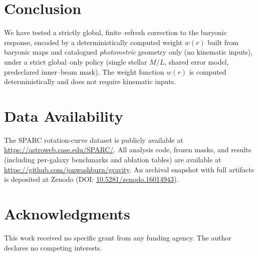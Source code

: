 \documentclass[usenatbib]{mnras}
\begin{document}
\section{Conclusion}

We have tested a strictly global, finite–refresh correction to the baryonic response, encoded by a deterministically computed weight $w(r)$ built from baryonic maps and catalogued \emph{photometric} geometry only (no kinematic inputs), under a strict global–only policy (single stellar $M/L$, shared error model, predeclared inner–beam mask). The weight function $w(r)$ is computed deterministically and does not require kinematic inputs.

\section*{Data Availability}

The SPARC rotation-curve dataset is publicly available at \href{https://astroweb.case.edu/SPARC/}{https://astroweb.case.edu/SPARC/}. All analysis code, frozen masks, and results (including per-galaxy benchmarks and ablation tables) are available at \href{https://github.com/jonwashburn/gravity}{https://github.com/jonwashburn/gravity}. An archival snapshot with full artifacts is deposited at Zenodo (DOI: \href{https://doi.org/10.5281/zenodo.16014943}{10.5281/zenodo.16014943}).

\section*{Acknowledgments}

This work received no specific grant from any funding agency. The author declares no competing interests.
\end{document}

